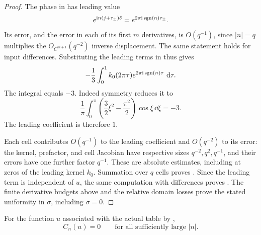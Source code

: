 \begin{proof}
The phase in  has leading value
\[
e^{\mathrm i n(j+\tau_\pm)\delta}
=e^{2\pi\mathrm i\operatorname{sgn}(n)\tau_\pm}.
\]
Its error, and the error in each of its first \(m\) derivatives,
is \(O(q^{-1})\), since \(|n|=q\) multiplies the
\(O_{C^{m+1}}(q^{-2})\) inverse displacement.
The same statement holds for input differences.
Substituting the leading terms in  thus gives
\[
-\frac13\int_0^1 k_0(2\pi\tau)e^{2\pi\mathrm i\operatorname{sgn}(n)\tau}\,\,\mathrm d\tau .
\]
The integral equals \(-3\).  Indeed symmetry reduces it to
\[
\frac1\pi\int_0^\pi
\left(\frac32\xi^2-\frac{\pi^2}{2}\right)\cos\xi\,\dd\xi=-3.
\]
The leading coefficient is therefore \(1\).

Each cell contributes \(O(q^{-1})\) to the leading coefficient and
\(O(q^{-2})\) to its error: the kernel, prefactor, and cell Jacobian
have respective sizes \(q^{-2},q^2,q^{-1}\), and their errors have
one further factor \(q^{-1}\). These are absolute estimates, including
at zeros of the leading kernel \(k_0\). Summation over \(q\) cells proves
.  Since the leading term is independent
of \(u\), the same computation with differences proves
.  The finite derivative budgets above
and the relative domain losses prove the stated uniformity in
\(\sigma\), including \(\sigma=0\).
\end{proof}

\begin{lemma}\label{ana:real-periodic-mesh}
For the function \(u\) associated with the actual table by
,
\begin{equation}\label{ana:constraint-vanishing}
C_n(u)=0
\qquad\text{for all sufficiently large }|n|.
\end{equation}
\end{lemma}


